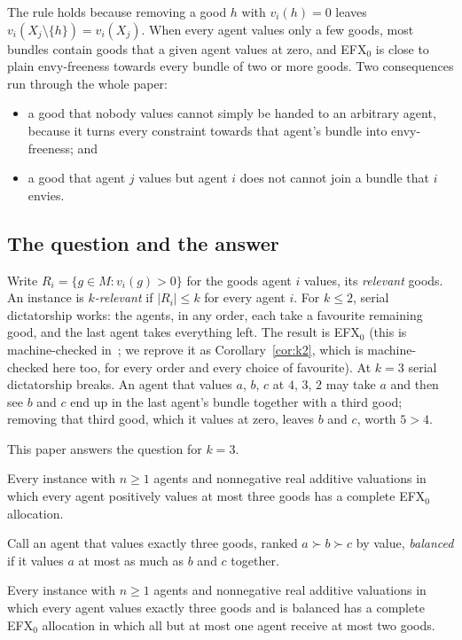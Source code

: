 \documentclass[runningheads,11pt]{llncs}
\newcommand{\efxz}{\texorpdfstring{\mbox{EFX$_0$}}{EFX0}}
\newcommand{\st}{\mathrel{:}}
\begin{document}
The rule holds because removing a good $h$ with $v_i(h)=0$ leaves $v_i(X_j\setminus\{h\})=v_i(X_j)$. When every agent values only a few goods, most bundles contain goods that a given agent values at zero, and \efxz{} is close to plain envy-freeness towards every bundle of two or more goods. Two consequences run through the whole paper:
\begin{itemize}
\item a good that nobody values cannot simply be handed to an arbitrary agent, because it turns every constraint towards that agent's bundle into envy-freeness; and
\item a good that agent $j$ values but agent $i$ does not cannot join a bundle that $i$ envies.
\end{itemize}

\subsection{The question and the answer}\label{sec:answer}

Write $R_i=\{g\in M\st v_i(g)>0\}$ for the goods agent $i$ values, its \emph{relevant} goods. An instance is \emph{$k$-relevant} if $|R_i|\le k$ for every agent $i$. For $k\le2$, serial dictatorship works: the agents, in any order, each take a favourite remaining good, and the last agent takes everything left. The result is \efxz{} (this is machine-checked in~\cite{MrdEfx}; we reprove it as Corollary~\ref{cor:k2}, which is machine-checked here too, for every order and every choice of favourite). At $k=3$ serial dictatorship breaks. An agent that values $a$, $b$, $c$ at $4$, $3$, $2$ may take $a$ and then see $b$ and $c$ end up in the last agent's bundle together with a third good; removing that third good, which it values at zero, leaves $b$ and $c$, worth $5>4$.

This paper answers the question for $k=3$.

\begin{theorem}[existence]\label{thm:target}
Every instance with $n\ge1$ agents and nonnegative real additive valuations in which every agent positively values at most three goods has a complete \efxz{} allocation.
\end{theorem}

\noindent Call an agent that values exactly three goods, ranked $a\succ b\succ c$ by value, \emph{balanced} if it values $a$ at most as much as $b$ and $c$ together.

\begin{theorem}\label{thm:D}
Every instance with $n\ge1$ agents and nonnegative real additive valuations in which every agent values exactly three goods and is balanced has a complete \efxz{} allocation in which all but at most one agent receive at most two goods.
\end{theorem}
\end{document}
